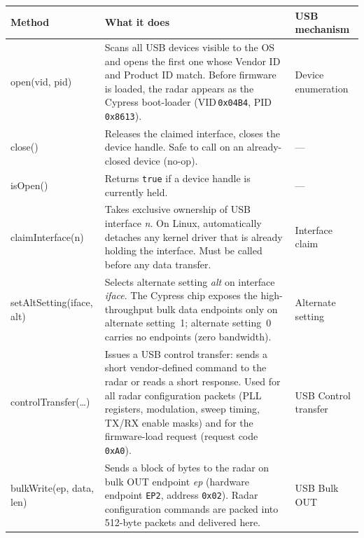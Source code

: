 \begin{table}[h!]
\centering
\small
\renewcommand{\arraystretch}{1.45}
\begin{tabularx}{\textwidth}{
    >{\ttfamily\raggedright}p{4.4cm}
    >{\raggedright\arraybackslash}X
    >{\raggedright\arraybackslash}p{2.6cm}
}
\toprule
\normalfont\textbf{Method} &
\textbf{What it does} &
\textbf{USB mechanism} \\
\midrule

open(vid, pid)
& Scans all USB devices visible to the OS and opens the first one whose
  Vendor ID and Product ID match. Before firmware is loaded, the radar
  appears as the Cypress boot-loader (VID\,\texttt{0x04B4},
  PID\,\texttt{0x8613}).
& Device enumeration \\

close()
& Releases the claimed interface, closes the device handle. Safe to call
  on an already-closed device (no-op).
& --- \\

isOpen()
& Returns \texttt{true} if a device handle is currently held.
& --- \\

claimInterface(n)
& Takes exclusive ownership of USB interface \textit{n}.  On Linux,
  automatically detaches any kernel driver that is already holding the
  interface. Must be called before any data transfer.
& Interface claim \\

setAltSetting(iface, alt)
& Selects alternate setting \textit{alt} on interface \textit{iface}.
  The Cypress chip exposes the high-throughput bulk data endpoints only
  on alternate setting~1; alternate setting~0 carries no endpoints
  (zero bandwidth).
& Alternate setting \\

controlTransfer(\ldots)
& Issues a USB control transfer: sends a short vendor-defined command to
  the radar or reads a short response. Used for all radar configuration
  packets (PLL registers, modulation, sweep timing, TX/RX enable masks)
  and for the firmware-load request (request code \texttt{0xA0}).
& USB Control transfer \\

bulkWrite(ep, data, len)
& Sends a block of bytes to the radar on bulk OUT endpoint \textit{ep}
  (hardware endpoint \texttt{EP2}, address \texttt{0x02}).
  Radar configuration commands are packed into 512-byte packets and
  delivered here.
& USB Bulk OUT \\


\end{tabularx}
\end{table}
